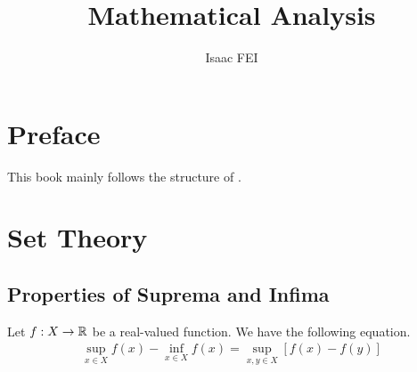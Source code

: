 \documentclass[thmcnt=section, 12pt]{my-elegantbook}
\title{Mathematical Analysis}
\author{Isaac FEI}
\begin{document}
\maketitle


\frontmatter
\chapter*{Preface}

This book mainly follows the structure of \cite{apostolMathematicalAnalysisModern1974}.


\tableofcontents
\mainmatter



\chapter{Set Theory}


\section{Properties of Suprema and Infima}

\begin{theorem} \label{thm:27}
    Let $f: X \to \mathbb{R}$ be a real-valued function. We have the following equation.
    \begin{align}
        \sup_{x \in X} f(x) - \inf_{x \in X} f(x)
        = \sup_{x,y \in X} [f(x) - f(y)]
        \label{eq:66}
    \end{align}
\end{theorem}
\end{document}
